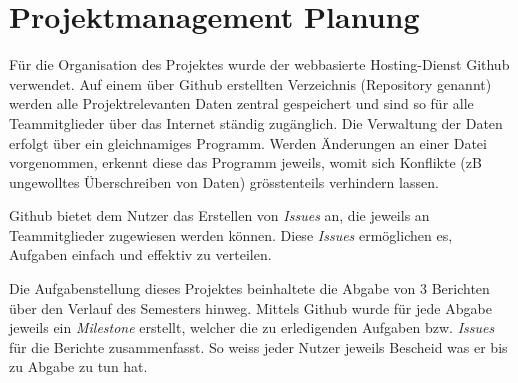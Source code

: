 \section{Projektmanagement Planung}
Für die Organisation des Projektes wurde der webbasierte Hosting-Dienst Github verwendet. Auf einem über Github erstellten Verzeichnis (Repository genannt) werden alle Projektrelevanten Daten zentral gespeichert und sind so für alle Teammitglieder über das Internet ständig zugänglich. Die Verwaltung der Daten erfolgt über ein gleichnamiges Programm. Werden Änderungen an einer Datei vorgenommen, erkennt diese das Programm jeweils, womit sich Konflikte (zB ungewolltes Überschreiben von Daten) grösstenteils verhindern lassen.

Github bietet dem Nutzer das Erstellen von \emph{Issues} an, die jeweils an Teammitglieder zugewiesen werden können. Diese \emph{Issues} ermöglichen es, Aufgaben einfach und effektiv zu verteilen.

Die Aufgabenstellung dieses Projektes beinhaltete die Abgabe von 3 Berichten über den Verlauf des Semesters hinweg. Mittels Github wurde für jede Abgabe jeweils ein \emph{Milestone} erstellt, welcher die zu erledigenden Aufgaben bzw. \emph{Issues} für die Berichte zusammenfasst. So weiss jeder Nutzer jeweils Bescheid was er bis zu Abgabe zu tun hat.






